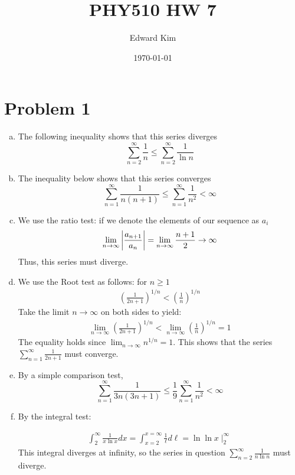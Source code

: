 \documentclass[12pt]{article}%
\title{PHY510 HW 7}
\author{Edward Kim}
\date{\today}
\newcommand{\infsum}[1][0]{\sum^{\infty}_{n = {#1}}}
\begin{document}
\maketitle

\section{Problem 1}
\begin{enumerate}[a.]
  \item The following inequality shows that this series diverges
  \begin{equation*}
      \infsum[2] \frac{1}{n} \leq \infsum[2]\frac{1}{\ln{n}}
  \end{equation*}
  \item The inequality below shows that this series converges
  \begin{equation*}
    \infsum[1] \frac{1}{n(n+1)} \leq \infsum[1]\frac{1}{n^2} < \infty
  \end{equation*}

  \item
  We use the ratio test: if we denote the elements of our sequence as $a_i$
  \begin{align*}
      \lim_{n \rightarrow \infty} \abs{\frac{a_{n+1}}{a_n}} = \lim_{n \rightarrow \infty} \frac{n+1}{2} \rightarrow \infty
  \end{align*}
  Thus, this series must diverge.

  \item
  We use the Root test as follows: for $n \geq 1$
  \begin{align*}
    \left( \frac{1}{2n+1}\right)^{1/n} < \left(\frac{1}{n}\right)^{1/n}
  \end{align*}
  Take the limit $n \rightarrow \infty$ on both sides to yield:
  \begin{align*}
    \lim_{n \rightarrow \infty} \left(\frac{1}{2n+1}\right)^{1/n} <   \lim_{n \rightarrow \infty} \left(\frac{1}{n}\right)^{1/n} = 1
  \end{align*}
  The equality holds since $\lim_{n \rightarrow \infty} n^{1/n} = 1$. This shows that the series $\infsum[1] \frac{1}{2n+1}$ must converge.

  \item By a simple comparison test,
  \begin{equation*}
      \infsum[1] \frac{1}{3n(3n+1)} \leq \frac{1}{9}\infsum[1] \frac{1}{n^2} < \infty
  \end{equation*}

  \item By the integral test:

  \begin{align*}
   \int_{2}^\infty \frac{1}{x\ln{x}} dx
     = \int_{x=2}^{x = \infty} \frac{1}{\ell} d\ell
    = \ln{\ln{x}}\mid_{2}^\infty
  \end{align*}
  This integral diverges at infinity, so the series in question  $\infsum[2] \frac{1}{n \ln{n}}$ must diverge.
\end{enumerate}
\end{document}
